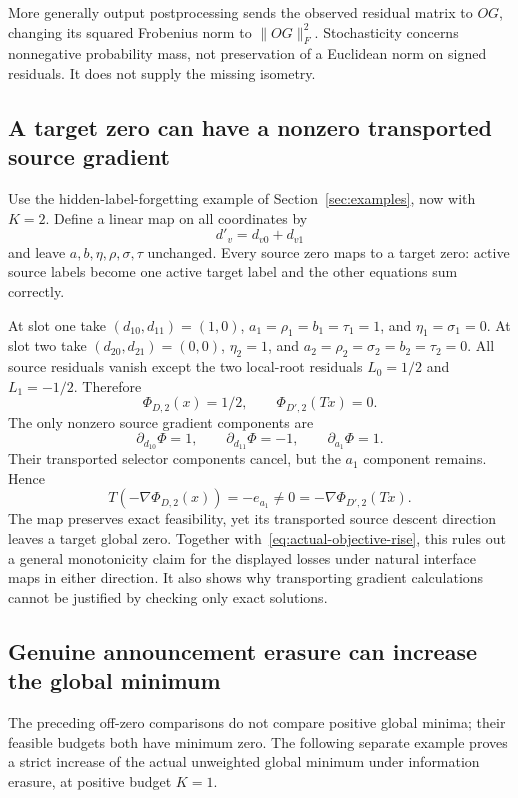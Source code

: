 \documentclass[11pt]{article}
\theoremstyle{remark}
\begin{document}
More generally output postprocessing sends the observed residual matrix to $OG$, changing its squared Frobenius norm to $\|OG\|_F^2$. Stochasticity concerns nonnegative probability mass, not preservation of a Euclidean norm on signed residuals. It does not supply the missing isometry.

\subsection{A target zero can have a nonzero transported source gradient}\label{sec:loss-drop}
Use the hidden-label-forgetting example of Section~\ref{sec:examples}, now with $K=2$. Define a linear map on all coordinates by
\[
 d'_v=d_{v0}+d_{v1}
\]
and leave $a,b,\eta,\rho,\sigma,\tau$ unchanged. Every source zero maps to a target zero: active source labels become one active target label and the other equations sum correctly.

At slot one take $(d_{10},d_{11})=(1,0)$, $a_1=\rho_1=b_1=\tau_1=1$, and $\eta_1=\sigma_1=0$. At slot two take $(d_{20},d_{21})=(0,0)$, $\eta_2=1$, and $a_2=\rho_2=\sigma_2=b_2=\tau_2=0$. All source residuals vanish except the two local-root residuals $L_0=1/2$ and $L_1=-1/2$. Therefore
\[
 \Phi_{D,2}(x)=1/2,\qquad \Phi_{D',2}(Tx)=0.
\]
The only nonzero source gradient components are
\[
 \partial_{d_{10}}\Phi=1,\qquad
 \partial_{d_{11}}\Phi=-1,\qquad
 \partial_{a_1}\Phi=1.
\]
Their transported selector components cancel, but the $a_1$ component remains. Hence
\begin{equation}\label{eq:gradient-drop}
 T(-\nabla\Phi_{D,2}(x))=-e_{a_1}\ne0
 =-\nabla\Phi_{D',2}(Tx).
\end{equation}
The map preserves exact feasibility, yet its transported source descent direction leaves a target global zero. Together with~\eqref{eq:actual-objective-rise}, this rules out a general monotonicity claim for the displayed losses under natural interface maps in either direction. It also shows why transporting gradient calculations cannot be justified by checking only exact solutions.

\subsection{Genuine announcement erasure can increase the global minimum}\label{sec:global-minimum}
The preceding off-zero comparisons do not compare positive global minima; their feasible budgets both have minimum zero. The following separate example proves a strict increase of the actual unweighted global minimum under information erasure, at positive budget $K=1$.
\end{document}
